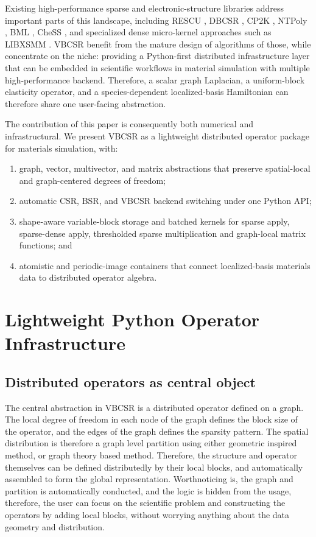 \documentclass[
reprint,
superscriptaddress,
frontmatterverbose,
amsmath,amssymb,
pra,
]{revtex4-2}
\begin{document}
Existing high-performance sparse and electronic-structure libraries address important parts of this landscape, including RESCU \cite{michaud2016rescu}, DBCSR \cite{sivkov2019dbcsr}, CP2K \cite{kuhne2020cp2k}, NTPoly \cite{dawson2018massively}, BML \cite{bock2018basic}, CheSS \cite{mohr2017efficient}, and specialized dense micro-kernel approaches such as LIBXSMM \cite{heinecke2016libxsmm}.  VBCSR benefit from the mature design of algorithms of those, while concentrate on the niche: providing a Python-first distributed infrastructure layer that can be embedded in scientific workflows in material simulation  with multiple high-performance backend.  Therefore, a scalar graph Laplacian, a uniform-block elasticity operator, and a species-dependent localized-basis Hamiltonian can therefore share one user-facing abstraction.

The contribution of this paper is consequently both numerical and infrastructural.  We present VBCSR as a lightweight distributed operator package for materials simulation, with:
\begin{enumerate}
    \item graph, vector, multivector, and matrix abstractions that preserve
    spatial-local and graph-centered degrees of freedom;
    \item automatic CSR, BSR, and VBCSR backend switching under one Python API;
    \item shape-aware variable-block storage and batched kernels for sparse apply,
    sparse-dense apply, thresholded sparse multiplication and graph-local matrix functions; and
    \item atomistic and periodic-image containers that connect localized-basis
    materials data to distributed operator algebra.
\end{enumerate}

\section{Lightweight Python Operator Infrastructure}

\subsection{Distributed operators as central object}

The central abstraction in VBCSR is a distributed operator defined on a graph. The local degree of freedom in each node of the graph defines the block size of the operator, and the edges of the graph defines the sparsity pattern. The spatial distribution is therefore a graph level partition using either geometric inspired method, or graph theory based method. Therefore, the structure and operator themselves can be defined distributedly by their local blocks, and automatically assembled to form the global representation. Worthnoticing is, the graph and partition is automatically conducted, and the logic is hidden from the usage, therefore, the user can focus on the scientific problem and constructing the operators by adding local blocks, without worrying anything about the data geometry and distribution.
\end{document}
